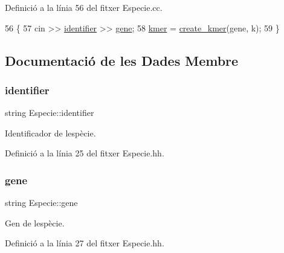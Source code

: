 Definició a la línia 56 del fitxer Especie.\+cc.


\begin{DoxyCode}
56                                        \{
57     cin >> \hyperlink{class_especie_a2c63b7e3b74779e58feb0a2446faabd1}{identifier} >> \hyperlink{class_especie_affa45d2f858415333f43caf121c7663a}{gene};
58     \hyperlink{class_especie_aa438e3e2f785d96c0ac51e83f60a5879}{kmer} = \hyperlink{class_especie_a7e6c7615ab5458259c1f20bcd68ebd80}{create\_kmer}(gene, k);
59 \}
\end{DoxyCode}


\subsection{Documentació de les Dades Membre}
\mbox{\label{class_especie_a2c63b7e3b74779e58feb0a2446faabd1}} 
\subsubsection{\texorpdfstring{identifier}{identifier}}
{\footnotesize\ttfamily string Especie\+::identifier\hspace{0.3cm}{\ttfamily [private]}}



Identificador de l\textquotesingle{}espècie. 



Definició a la línia 25 del fitxer Especie.\+hh.

\mbox{\label{class_especie_affa45d2f858415333f43caf121c7663a}} 
\subsubsection{\texorpdfstring{gene}{gene}}
{\footnotesize\ttfamily string Especie\+::gene\hspace{0.3cm}{\ttfamily [private]}}



Gen de l\textquotesingle{}espècie. 



Definició a la línia 27 del fitxer Especie.\+hh.

\mbox{\label{class_especie_aa438e3e2f785d96c0ac51e83f60a5879}} 
